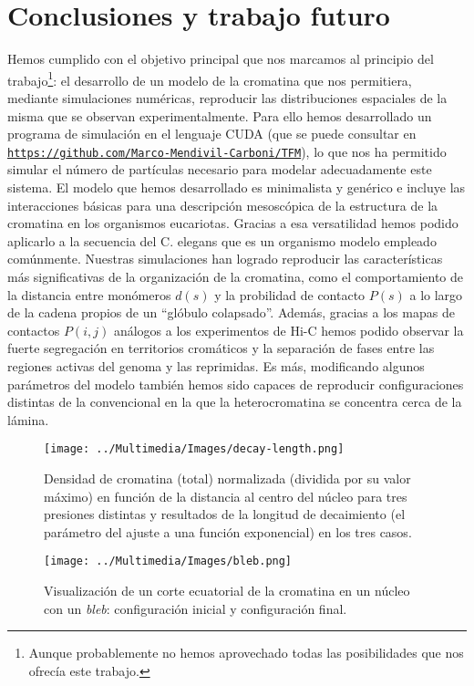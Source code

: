 \chapter{Conclusiones y trabajo futuro}
\label{cap:conclusions}

Hemos cumplido con el objetivo principal que nos marcamos al principio del trabajo\footnote{Aunque probablemente no hemos aprovechado todas las posibilidades que nos ofrecía este trabajo.}: el desarrollo de un modelo de la cromatina que nos permitiera, mediante simulaciones numéricas, reproducir las distribuciones espaciales de la misma que se observan experimentalmente. Para ello hemos desarrollado un programa de simulación en el lenguaje CUDA (que se puede consultar en \href{https://github.com/Marco-Mendivil-Carboni/TFM}{\texttt{https://github.com/Marco-Mendivil-Carboni/TFM}}), lo que nos ha permitido simular el número de partículas necesario para modelar adecuadamente este sistema. El modelo que hemos desarrollado es minimalista y genérico e incluye las interacciones básicas para una descripción mesoscópica de la estructura de la cromatina en los organismos eucariotas. Gracias a esa versatilidad hemos podido aplicarlo a la secuencia del C. elegans que es un organismo modelo empleado comúnmente. Nuestras simulaciones han logrado reproducir las características más significativas de la organización de la cromatina, como el comportamiento de la distancia entre monómeros $d(s)$ y la probilidad de contacto $P(s)$ a lo largo de la cadena propios de un ``glóbulo colapsado''. Además, gracias a los mapas de contactos $P(i,j)$ análogos a los experimentos de Hi-C hemos podido observar la fuerte segregación en territorios cromáticos y la separación de fases entre las regiones activas del genoma y las reprimidas. Es más, modificando algunos parámetros del modelo también hemos sido capaces de reproducir configuraciones distintas de la convencional en la que la heterocromatina se concentra cerca de la lámina.

\begin{figure}[p]
    \centering
    \texttt{[image: ../Multimedia/Images/decay-length.png]}
    \caption{Densidad de cromatina (total) normalizada (dividida por su valor máximo) en función de la distancia al centro del núcleo para tres presiones distintas y resultados de la longitud de decaimiento (el parámetro del ajuste a una función exponencial) en los tres casos.}
    \label{fig:exp-fit}
\end{figure}

\begin{figure}[p]
    \centering
    \texttt{[image: ../Multimedia/Images/bleb.png]}
    \caption{Visualización de un corte ecuatorial de la cromatina en un núcleo con un \textit{bleb}: configuración inicial y configuración final.}
    \label{fig:bleb}
\end{figure}

